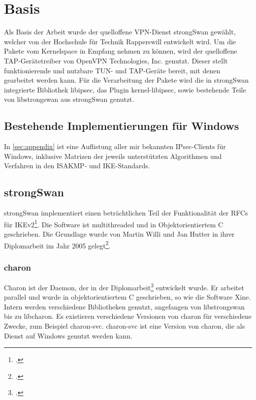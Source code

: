 


\section{Basis}
Als Basis der Arbeit wurde der quelloffene VPN-Dienst strongSwan gewählt,
welcher von der Hochschule für Technik Rapperswill entwickelt wird.
Um die Pakete vom Kernelspace in Empfang nehmen zu können, wird der quelloffene
TAP-Gerätetreiber von OpenVPN Technologies, Inc. genutzt. Dieser stellt funktionierende
und nutzbare TUN- und TAP-Geräte bereit, mit denen gearbeitet werden kann.
Für die Verarbeitung der Pakete wird die in strongSwan integrierte Bibliothek libipsec,
das Plugin kernel-libipsec, sowie bestehende Teile von libstrongswan
aus strongSwan genutzt.

\subsection{Bestehende Implementierungen für Windows}

In \autoref{sec:appendix} ist eine Auflistung aller mir bekannten IPsec-Clients für Windows,
inklusive Matrizen der jeweils unterstützten Algorithmen und Verfahren in den ISAKMP-
und IKE-Standards.

\subsection{strongSwan}
strongSwan implementiert einen beträchtlichen Teil der Funktionalität der \acp{RFC} für IKEv2\footcite{_ipsecstandards_2016}.
Die Software ist multithreaded und in Objektorientiertem C geschrieben.
Die Grundlage wurde von Martin Willi und Jan Hutter in ihrer Diplomarbeit im Jahr 2005 gelegt\footcite[][]{jan_hutter_strongswan_2005}.
\subsubsection{charon}
Charon ist der Daemon, der in der Diplomarbeit\footcite[][]{jan_hutter_strongswan_2005} entwickelt wurde.
Er arbeitet parallel und wurde in objektorientiertem C geschrieben, so wie die Software Xine.
Intern werden verschiedene Bibliotheken genutzt, angefangen von libstrongswan bis zu libcharon.
Es existieren verschiedene Versionen von charon für verschiedene Zwecke, zum Beispiel
charon-svc. charon-svc ist eine Version von charon, die als Dienst auf Windows genutzt werden kann.
